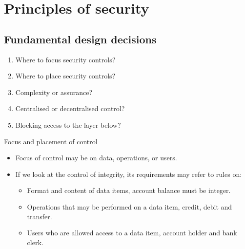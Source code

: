 


\section{Principles of security}

\subsection{Fundamental design decisions}

\begin{frame}
  \begin{enumerate}
    \item Where to focus security controls?
    \item Where to place security controls?
    \item Complexity or assurance?
    \item Centralised or decentralised control?
    \item Blocking access to the layer below?
  \end{enumerate}
\end{frame}

\begin{frame}
  \begin{block}{Focus and placement of control}
    \begin{itemize}
      \item Focus of control may be on data, operations, or users.

      \item If we look at the control of integrity, its requirements may refer to 
        rules on:
        \begin{itemize}
          \item Format and content of data items, \eg account balance must be 
            integer.

          \item Operations that may be performed on a data item, \eg credit, debit 
            and transfer.

          \item Users who are allowed access to a data item, \eg account holder 
            and bank clerk.
        \end{itemize}
    \end{itemize}
  \end{block}
\end{frame}

